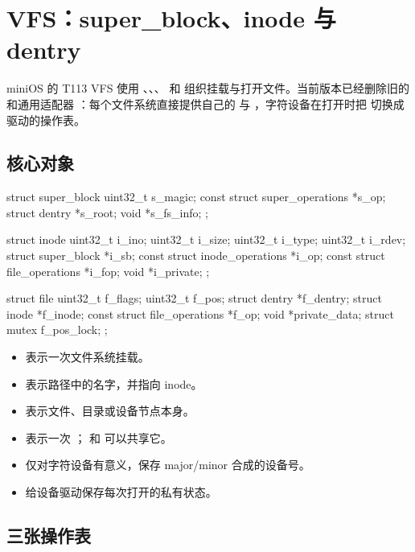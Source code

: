 \chapter{VFS：super\_block、inode 与 dentry}
\label{chap:vfs}
miniOS 的 T113 VFS 使用 、、、 和 组织挂载与打开文件。当前版本已经删除旧的 和通用适配器 ：每个文件系统直接提供自己的  与 ，字符设备在打开时把 切换成驱动的操作表。

\section{核心对象}

\begin{ccode}
struct super_block {
    uint32_t s_magic;
    const struct super_operations *s_op;
    struct dentry *s_root;
    void *s_fs_info;
};

struct inode {
    uint32_t i_ino;
    uint32_t i_size;
    uint32_t i_type;
    uint32_t i_rdev;
    struct super_block *i_sb;
    const struct inode_operations *i_op;
    const struct file_operations *i_fop;
    void *i_private;
};

struct file {
    uint32_t f_flags;
    uint32_t f_pos;
    struct dentry *f_dentry;
    struct inode *f_inode;
    const struct file_operations *f_op;
    void *private_data;
    struct mutex f_pos_lock;
};
\end{ccode}

\begin{itemize}
  \item {} 表示一次文件系统挂载。
  \item {} 表示路径中的名字，并指向 inode。
  \item {} 表示文件、目录或设备节点本身。
  \item {} 表示一次 ； 和  可以共享它。
  \item {} 仅对字符设备有意义，保存 major/minor 合成的设备号。
  \item {} 给设备驱动保存每次打开的私有状态。
\end{itemize}

\section{三张操作表}

